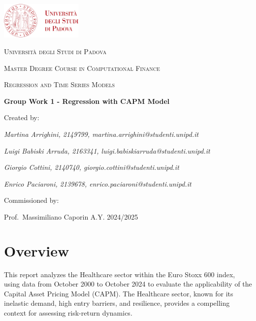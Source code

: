 \documentclass[12pt, openright, oneside]{report}
\begin{document}

    \begin{titlepage}
        \centering
        \includegraphics[width=0.3\textwidth]{images/logo_unipd.png}\par\vspace{1cm}
        {\scshape\LARGE Università degli Studi di Padova \par}
        \vspace{1.5cm}
        {\scshape\Large Master Degree Course in Computational Finance \par}
        \vspace{.2cm}
        {\scshape\large Regression and Time Series Models \par}
        \vspace{2cm}
        {\Large\bfseries Group Work 1 - Regression with CAPM Model\par}
        \vspace{2cm}
        Created by:\par
        {\itshape{Martina Arrighini, 2149799, martina.arrighini@studenti.unipd.it}\par}
        {\itshape{Luigi Babiski Arruda, 2163341, luigi.babiskiarruda@studenti.unipd.it}\par}
        {\itshape{Giorgio Cottini, 2140740, giorgio.cottini@studenti.unipd.it}\par}
        {\itshape{Enrico Paciaroni, 2139678, enrico.paciaroni@studenti.unipd.it}\par}
        \vfill
        Commissioned by:\par
        Prof.\ Massimiliano Caporin
        \vfill
        {\large A.Y. 2024/2025}
    \end{titlepage}

\setcounter{page}{1}

\tableofcontents

\chapter*{Overview}
This report analyzes the Healthcare sector within the Euro Stoxx 600 index, using data from October 2000 to October 2024 to
evaluate the applicability of the Capital Asset Pricing Model (CAPM). 
The Healthcare sector, known for its inelastic demand, high entry barriers, and resilience, provides a compelling context for 
assessing risk-return dynamics.
\end{document}
